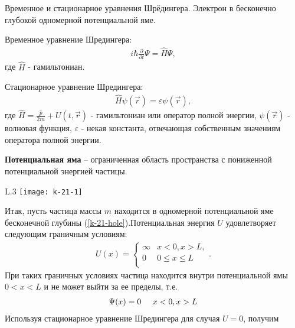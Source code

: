 \documentclass[__main__.tex]{subfiles}
\begin{document}
Временное и стационарное уравнения Шрёдингера. Электрон в бесконечно глубокой одномерной потенциальной яме.\\

\begin{definition}
    Временное уравнение Шредингера:
    \begin{gather}
        i\hbar\frac{\partial{}}{\partial{t}}\Psi = \hat{H}\Psi,
        \label{shred-time}
    \end{gather}
    где $\hat{H}$ - гамильтониан.
\end{definition}
\begin{definition}
    Стационарное уравнение Шредингера:
    \begin{gather}
        \hat{H}\psi(\vec{r})=\varepsilon\psi(\vec{r}),
        \label{shred-stac}
    \end{gather}
    где $\hat{H}=\frac{\hat{p}}{2m}+U(t,\vec{r})$ - гамильтониан или оператор полной энергии, $\psi(\vec{r})$ - волновая функция, $\varepsilon$ - некая константа,  отвечающая собственным значениям оператора полной энергии.
\end{definition}
\begin{definition}
    \textbf{Потенциальная яма} – ограниченная область пространства с пониженной потенциальной энергией частицы.
    \label{hole}
\end{definition}
\begin{wrapfigure}{L}{.3\linewidth}
    \texttt{[image: k-21-1]}
    \caption{Бесконечная прямоугольная потенциальная яма}
    \label{k-21-hole}
\end{wrapfigure}
Итак, пусть частица массы $m$ находится в одномерной потенциальной яме бесконечной глубины (\ref{k-21-hole}).Потенциальная энергия $U$ удовлетворяет следующим граничным условиям:
\begin{gather}
    \label{k-21-boundary}
    U(x)=
    \begin{cases}
        \infty & x<0,x>L,       \\
        0      & 0\leq x \leq L \\
    \end{cases}.
\end{gather}
При таких граничных условиях частица находится внутри потенциальной ямы $0 < x < L$ и не может выйти за ее пределы, т.е.
\begin{gather}
    \label{k-21-psi}
    \Psi(x)=0\hspace{0.5cm}x<0,x>L
\end{gather}
Используя стационарное уравнение Шредингера для случая $U=0$, получим
\end{document}

